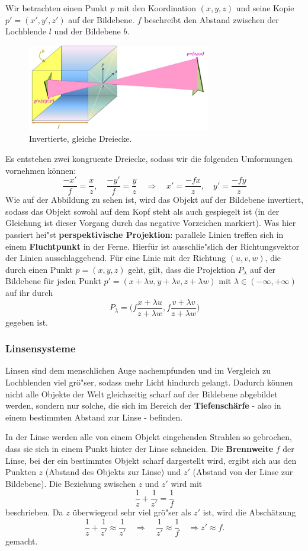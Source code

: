 Wir betrachten einen Punkt $p$ mit den Koordination $(x,y,z)$ und seine \glqq Kopie\grqq\ $p'=(x',y',z')$ auf der Bildebene. $f$ beschreibt den Abstand zwischen der Lochblende $l$ und der Bildebene $b$.
\begin{figure}[h]
\centering
\includegraphics[width=8cm]{chapters/computervision/Grafik_2_Lochkamera.JPG}
\caption{Invertierte, gleiche Dreiecke.}
\label{fig:2}
\end{figure}
Es entstehen zwei kongruente Dreiecke, sodass wir die folgenden Umformungen vornehmen können:
\[\frac{-x'}{f}=\frac{x}{z},\quad \frac{-y'}{f}=\frac{y}{z} \quad \Rightarrow \quad x'=\frac{-fx}{z}, \quad y'=\frac{-fy}{z}\]
Wie auf der Abbildung zu sehen ist, wird das Objekt auf der Bildebene invertiert, sodass das Objekt sowohl auf dem Kopf steht als auch gespiegelt ist (in der Gleichung ist dieser Vorgang durch das negative Vorzeichen markiert). Was hier passiert hei"st \textbf{perspektivische Projektion}: parallele Linien treffen sich in einem \textbf{Fluchtpunkt} in der Ferne. Hierfür ist ausschlie"slich der Richtungsvektor der Linien ausschlaggebend.
Für eine Linie mit der Richtung $(u,v,w)$, die durch einen Punkt $p=(x,y,z)$ geht, gilt, dass die Projektion $P_\lambda$ auf der Bildebene für jeden Punkt $p'=(x+\lambda u,y+\lambda v,z+\lambda w)$ mit $\lambda\in (-\infty,+\infty)$ auf ihr durch
\[P_\lambda=\Bigg( f\frac{x+\lambda u}{z+\lambda w},f\frac{v+\lambda v}{z+\lambda w} \Bigg)\]
gegeben ist.

\subsubsection{Linsensysteme}
Linsen sind dem menschlichen Auge nachempfunden und im Vergleich zu Lochblenden viel grö"ser, sodass mehr Licht hindurch gelangt. Dadurch können nicht alle Objekte der Welt gleichzeitig scharf auf der Bildebene abgebildet werden, sondern nur solche, die sich im Bereich der \textbf{Tiefenschärfe} - also in einem bestimmten Abstand zur Linse - befinden.

In der Linse werden alle von einem Objekt eingehenden Strahlen so gebrochen, dass sie sich in einem Punkt hinter der Linse schneiden.
Die \textbf{Brennweite} $f$ der Linse, bei der ein bestimmtes Objekt scharf dargestellt wird, ergibt sich aus den Punkten $z$ (Abstand des Objekts zur Linse) und $z'$ (Abstand von der Linse zur Bildebene). Die Beziehung zwischen $z$ und $z'$ wird mit
\[\frac{1}{z}+\frac{1}{z'}=\frac{1}{f}\]
beschrieben. Da $z$ überwiegend sehr viel grö"ser als $z'$ ist, wird die Abschätzung
\[\frac{1}{z}+\frac{1}{z'}\approx\frac{1}{z'}\quad\Rightarrow\quad\frac{1}{z'}\approx\frac{1}{f}\quad\Rightarrow z'\approx f.\]
gemacht.

